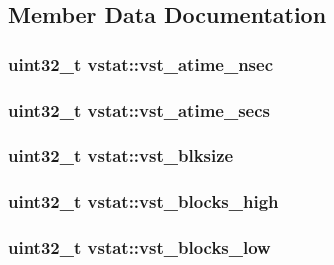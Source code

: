 \subsection{Member Data Documentation}
\hypertarget{structvstat_aed30c48942d765f66bbb37090db6b688}{
\subsubsection[{vst\+\_\+atime\+\_\+nsec}]{\setlength{\rightskip}{0pt plus 5cm}uint32\+\_\+t vstat\+::vst\+\_\+atime\+\_\+nsec}}\label{structvstat_aed30c48942d765f66bbb37090db6b688}
\hypertarget{structvstat_a736e9b40935eb78b600975b529920036}{
\subsubsection[{vst\+\_\+atime\+\_\+secs}]{\setlength{\rightskip}{0pt plus 5cm}uint32\+\_\+t vstat\+::vst\+\_\+atime\+\_\+secs}}\label{structvstat_a736e9b40935eb78b600975b529920036}
\hypertarget{structvstat_a2adc2cc94403fbbd36f0e8404b1a9da5}{
\subsubsection[{vst\+\_\+blksize}]{\setlength{\rightskip}{0pt plus 5cm}uint32\+\_\+t vstat\+::vst\+\_\+blksize}}\label{structvstat_a2adc2cc94403fbbd36f0e8404b1a9da5}
\hypertarget{structvstat_a6003873e75b89f59bab19597509b4a02}{
\subsubsection[{vst\+\_\+blocks\+\_\+high}]{\setlength{\rightskip}{0pt plus 5cm}uint32\+\_\+t vstat\+::vst\+\_\+blocks\+\_\+high}}\label{structvstat_a6003873e75b89f59bab19597509b4a02}
\hypertarget{structvstat_a54e9d0d71875f5b0de6463b57bbb23b2}{
\subsubsection[{vst\+\_\+blocks\+\_\+low}]{\setlength{\rightskip}{0pt plus 5cm}uint32\+\_\+t vstat\+::vst\+\_\+blocks\+\_\+low}}\label{structvstat_a54e9d0d71875f5b0de6463b57bbb23b2}

